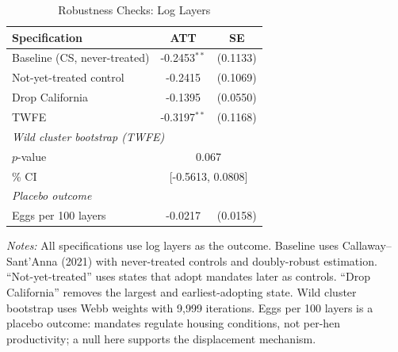 \begin{table}[htbp]
\centering
\caption{Robustness Checks: Log Layers}
\label{tab:robust}
\begin{tabular}{lcc}
\hline\hline
Specification & ATT & SE \\
\hline
Baseline (CS, never-treated) & -0.2453$^{**}$ & (0.1133) \\
Not-yet-treated control & -0.2415 & (0.1069) \\
Drop California & -0.1395 & (0.0550) \\
TWFE & -0.3197$^{**}$ & (0.1168) \\
\hline
\multicolumn{3}{l}{\textit{Wild cluster bootstrap (TWFE)}} \\
\quad $p$-value & \multicolumn{2}{c}{0.067} \\
\quad 95\% CI & \multicolumn{2}{c}{[-0.5613, 0.0808]} \\
\hline
\multicolumn{3}{l}{\textit{Placebo outcome}} \\
Eggs per 100 layers & -0.0217 & (0.0158) \\
\hline\hline
\end{tabular}
\begin{tablenotes}[flushleft]
\small
\item \textit{Notes:} All specifications use log layers as the outcome. Baseline uses Callaway--Sant'Anna (2021) with never-treated controls and doubly-robust estimation. ``Not-yet-treated'' uses states that adopt mandates later as controls. ``Drop California'' removes the largest and earliest-adopting state. Wild cluster bootstrap uses Webb weights with 9,999 iterations. Eggs per 100 layers is a placebo outcome: mandates regulate housing conditions, not per-hen productivity; a null here supports the displacement mechanism.
\end{tablenotes}
\end{table}

